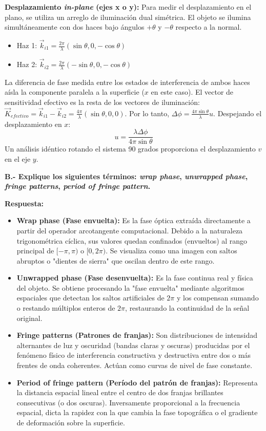 \documentclass[12pt,letterpaper]{article}
\begin{document}
	\textbf{Desplazamiento \textit{in-plane} (ejes x o y):}
	Para medir el desplazamiento en el plano, se utiliza un arreglo de iluminación dual simétrica. El objeto se ilumina simultáneamente con dos haces bajo ángulos $+\theta$ y $-\theta$ respecto a la normal.
	\begin{itemize}
		\item Haz 1: $\vec{k}_{i1} = \frac{2\pi}{\lambda}(\sin\theta, 0, -\cos\theta)$
		\item Haz 2: $\vec{k}_{i2} = \frac{2\pi}{\lambda}(-\sin\theta, 0, -\cos\theta)$
	\end{itemize}
	La diferencia de fase medida entre los estados de interferencia de ambos haces aísla la componente paralela a la superficie ($x$ en este caso). El vector de sensitividad efectivo es la resta de los vectores de iluminación: $\vec{K}_{efectivo} = \vec{k}_{i1} - \vec{k}_{i2} = \frac{4\pi}{\lambda}(\sin\theta, 0, 0)$.
	Por lo tanto, $\Delta\phi = \frac{4\pi \sin\theta}{\lambda} u$.
	Despejando el desplazamiento en $x$:
	\[
	u = \frac{\lambda \Delta\phi}{4\pi \sin\theta}
	\]
	Un análisis idéntico rotando el sistema 90 grados proporciona el desplazamiento $v$ en el eje $y$.
	
	\vspace{0.8cm}
	\noindent \textbf{B.- Explique los siguientes términos: \textit{wrap phase}, \textit{unwrapped phase}, \textit{fringe patterns}, \textit{period of fringe pattern}.}
	
	\textbf{Respuesta:}
	\begin{itemize}
		\item \textbf{Wrap phase (Fase envuelta):} Es la fase óptica extraída directamente a partir del operador arcotangente computacional. Debido a la naturaleza trigonométrica cíclica, sus valores quedan confinados (envueltos) al rango principal de $[-\pi, \pi)$ o $[0, 2\pi)$. Se visualiza como una imagen con saltos abruptos o "dientes de sierra" que oscilan dentro de este rango.
		\item \textbf{Unwrapped phase (Fase desenvuelta):} Es la fase continua real y física del objeto. Se obtiene procesando la "fase envuelta" mediante algoritmos espaciales que detectan los saltos artificiales de $2\pi$ y los compensan sumando o restando múltiplos enteros de $2\pi$, restaurando la continuidad de la señal original.
		\item \textbf{Fringe patterns (Patrones de franjas):} Son distribuciones de intensidad alternantes de luz y oscuridad (bandas claras y oscuras) producidas por el fenómeno físico de interferencia constructiva y destructiva entre dos o más frentes de onda coherentes. Actúan como curvas de nivel de fase constante.
		\item \textbf{Period of fringe pattern (Período del patrón de franjas):} Representa la distancia espacial lineal entre el centro de dos franjas brillantes consecutivas (o dos oscuras). Inversamente proporcional a la frecuencia espacial, dicta la rapidez con la que cambia la fase topográfica o el gradiente de deformación sobre la superficie.
	\end{itemize}
	
\end{document}
